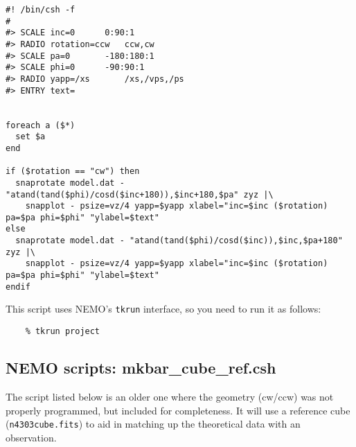 \documentclass[11pt]{article}
\begin{document}
\footnotesize\begin{verbatim}
#! /bin/csh -f 
#
#> SCALE inc=0		0:90:1
#> RADIO rotation=ccw   ccw,cw
#> SCALE pa=0		-180:180:1
#> SCALE phi=0		-90:90:1
#> RADIO yapp=/xs       /xs,/vps,/ps
#> ENTRY text=  


foreach a ($*)
  set $a
end

if ($rotation == "cw") then
  snaprotate model.dat - "atand(tand($phi)/cosd($inc+180)),$inc+180,$pa" zyz |\
    snapplot - psize=vz/4 yapp=$yapp xlabel="inc=$inc ($rotation) pa=$pa phi=$phi" "ylabel=$text"
else
  snaprotate model.dat - "atand(tand($phi)/cosd($inc)),$inc,$pa+180" zyz |\
    snapplot - psize=vz/4 yapp=$yapp xlabel="inc=$inc ($rotation) pa=$pa phi=$phi" "ylabel=$text"
endif

\end{verbatim}\normalsize

This script uses NEMO's {\tt tkrun} interface, so you need to run it
as follows:

\footnotesize\begin{verbatim}
    % tkrun project
\end{verbatim}\normalsize

\subsection{NEMO scripts: mkbar\_cube\_ref.csh}

The script listed below is an older one where the geometry (cw/ccw) was not 
properly programmed, but included for completeness. It will use a reference
cube ({\tt n4303cube.fits}) to aid in matching up the theoretical data with
an observation.
\end{document}
